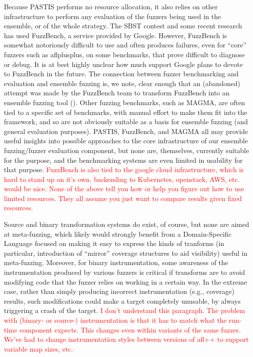 \documentclass[numbers]{proposalnsf}
\newcommand{\jdh}[1]{\textcolor{red}{#1}}
\begin{document}
Because PASTIS performs no resource allocation, it also relies on other infrastructure to perform any evaluation of the fuzzers being used in the ensemble, or of the whole strategy.  The SBST contest and some recent research has used FuzzBench, a service provided by Google.  However, FuzzBench is somewhat notoriously difficult to use and often produces failures, even for ``core'' fuzzers such as aflplusplus, on some benchmarks, that prove difficult to diagnose or debug.  It is at best highly unclear how much support Google plans to devote to FuzzBench in the future.  The connection between fuzzer benchmarking and evaluation and ensemble fuzzing is, we note, clear enough that an (abandoned) attempt was made by the FuzzBench team to transform FuzzBench into an ensemble fuzzing tool (\url{}).   Other fuzzing benchmarks, such as MAGMA, are often tied to a specific set of benchmarks, with manual effort to make them fit into the framework, and so are not obviously suitable as a basis for ensemble fuzzing (and general evaluation purposes).  PASTIS, FuzzBench, and MAGMA all may provide useful insights into possible approaches to the core infrastructure of our ensemble fuzzing/fuzzer evaluation component, but none are, themselves, currently suitable for the purpose, and the benchmarking systems are even limited in usability for that purpose. 
\jdh{FuzzBench is also tied to the google cloud infrastructure, which is hard to stand up on it's own.  backending to Kubernetes, openstack, AWS, etc. would be nice.  None of the above tell you how or help you figure out how to use limited resources.  They all assume you just want to compare results given fixed resources.}


Source and binary transformation systems do exist, of course, but none are aimed at meta-fuzzing, which likely would strongly benefit from a Domain-Specific Language focused on making it easy to express the kinds of tranforms (in particular, introduction of ``mirror'' coverage structures to aid visibility) useful in meta-fuzzing.  Moreover, for binary instrumentation, some awareness of the instrumentation produced by various fuzzers is critical if transforms are to avoid modifying code that the fuzzer relies on working in a certain way.  In the extreme case, rather than simply producing incorrect instrumentation (e.g., coverage) results, such modifications could make a target completely unusable, by always triggering a crash of the target.
\jdh{I don't understand this paragraph.  The problem with (binary- or source-) instrumentation is that it has to match what the run-time component expects.  This changes even within variants of the same fuzzer.  
We've had to change instrumentation styles between versions of afl++ to support variable map sizes, etc.  }
\end{document}
